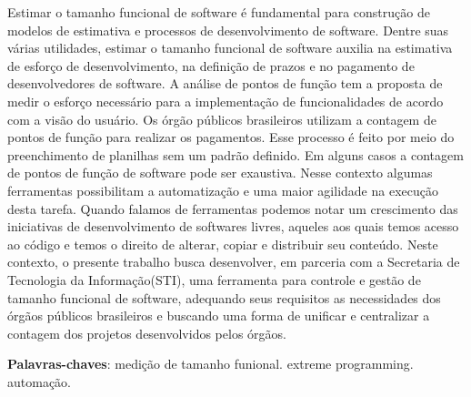 \begin{resumo}
Estimar o tamanho funcional de software é fundamental para construção de modelos de estimativa e processos de desenvolvimento de software. Dentre suas várias utilidades, estimar o tamanho funcional de software auxilia na estimativa de esforço de desenvolvimento, na definição de prazos e no pagamento de desenvolvedores de software. A análise de pontos de função tem a proposta de medir o esforço necessário para a implementação de funcionalidades de acordo com a visão do usuário. Os órgão públicos brasileiros utilizam a contagem de pontos de função para realizar os pagamentos. Esse processo é feito por meio do preenchimento de planilhas sem um padrão definido. Em alguns casos a contagem de pontos de função de software pode ser exaustiva. Nesse contexto algumas ferramentas possibilitam a automatização e uma maior agilidade na execução desta tarefa. Quando falamos de ferramentas podemos notar um crescimento das iniciativas de desenvolvimento de softwares livres, aqueles aos quais temos acesso ao código e temos o direito de alterar, copiar e distribuir seu conteúdo.  Neste contexto, o presente trabalho busca desenvolver, em parceria com a Secretaria de Tecnologia da Informação(STI), uma ferramenta para controle e gestão de tamanho funcional de software, adequando seus requisitos as necessidades dos órgãos públicos brasileiros e buscando uma forma de unificar e centralizar a contagem dos projetos desenvolvidos pelos órgãos.


 \vspace{\onelineskip}

 \noindent
 \textbf{Palavras-chaves}: medição de tamanho funional. extreme programming. automação.
\end{resumo}
